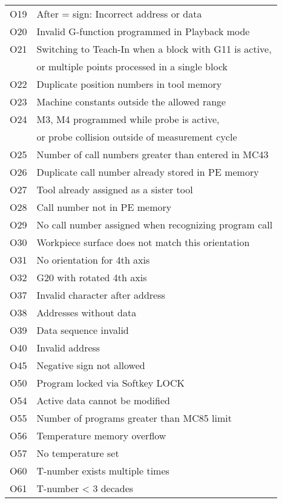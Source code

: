 \documentclass[openany,11pt]{book}
\begin{document}
\begin{table}[!h]
    \begin{tabular}{ll}
    O19  & After = sign: Incorrect address or data \\
    O20  & Invalid G-function programmed in Playback mode \\
    O21  & Switching to Teach-In when a block with G11 is active, \\
         & or multiple points processed in a single block \\
    O22  & Duplicate position numbers in tool memory \\
    O23  & Machine constants outside the allowed range \\
    O24  & M3, M4 programmed while probe is active, \\
         & or probe collision outside of measurement cycle \\
    O25  & Number of call numbers greater than entered in MC43 \\
    O26  & Duplicate call number already stored in PE memory \\
    O27  & Tool already assigned as a sister tool \\
    O28  & Call number not in PE memory \\
    O29  & No call number assigned when recognizing program call \\
    O30  & Workpiece surface does not match this orientation \\
    O31  & No orientation for 4th axis \\
    O32  & G20 with rotated 4th axis \\
    O37  & Invalid character after address \\
    O38  & Addresses without data \\
    O39  & Data sequence invalid \\
    O40  & Invalid address \\
    O45  & Negative sign not allowed \\
    O50  & Program locked via Softkey LOCK \\
    O54  & Active data cannot be modified \\
    O55  & Number of programs greater than MC85 limit \\
    O56  & Temperature memory overflow \\
    O57  & No temperature set \\
    O60  & T-number exists multiple times \\
    O61  & T-number < 3 decades \\

\end{tabular}
\end{table}
\end{document}
